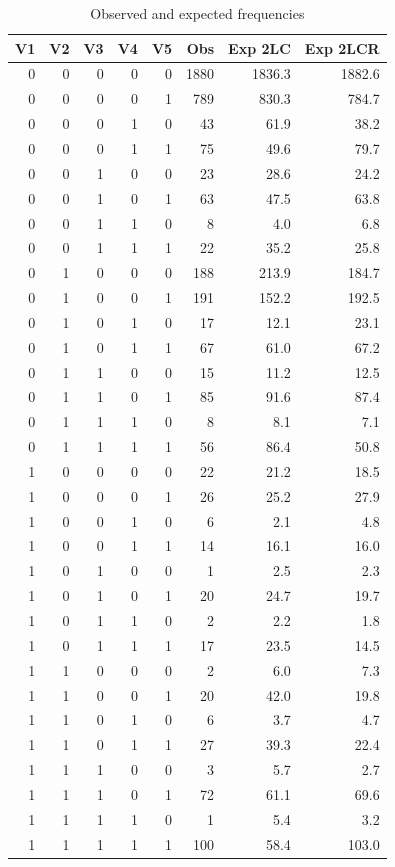 \documentclass[a4paper]{article}
\begin{document}
\begin{table}[ht]
\begin{center}
\begin{tabular}{rrrrrrrr}
  \hline
V1 & V2 & V3 & V4 & V5 & Obs & Exp 2LC & Exp 2LCR \\
  \hline
0 & 0 & 0 & 0 & 0 & 1880 & 1836.3 & 1882.6 \\
  0 & 0 & 0 & 0 & 1 & 789 & 830.3 & 784.7 \\
  0 & 0 & 0 & 1 & 0 & 43 & 61.9 & 38.2 \\
  0 & 0 & 0 & 1 & 1 & 75 & 49.6 & 79.7 \\
  0 & 0 & 1 & 0 & 0 & 23 & 28.6 & 24.2 \\
  0 & 0 & 1 & 0 & 1 & 63 & 47.5 & 63.8 \\
  0 & 0 & 1 & 1 & 0 & 8 & 4.0 & 6.8 \\
  0 & 0 & 1 & 1 & 1 & 22 & 35.2 & 25.8 \\
  0 & 1 & 0 & 0 & 0 & 188 & 213.9 & 184.7 \\
  0 & 1 & 0 & 0 & 1 & 191 & 152.2 & 192.5 \\
  0 & 1 & 0 & 1 & 0 & 17 & 12.1 & 23.1 \\
  0 & 1 & 0 & 1 & 1 & 67 & 61.0 & 67.2 \\
  0 & 1 & 1 & 0 & 0 & 15 & 11.2 & 12.5 \\
  0 & 1 & 1 & 0 & 1 & 85 & 91.6 & 87.4 \\
  0 & 1 & 1 & 1 & 0 & 8 & 8.1 & 7.1 \\
  0 & 1 & 1 & 1 & 1 & 56 & 86.4 & 50.8 \\
  1 & 0 & 0 & 0 & 0 & 22 & 21.2 & 18.5 \\
  1 & 0 & 0 & 0 & 1 & 26 & 25.2 & 27.9 \\
  1 & 0 & 0 & 1 & 0 & 6 & 2.1 & 4.8 \\
  1 & 0 & 0 & 1 & 1 & 14 & 16.1 & 16.0 \\
  1 & 0 & 1 & 0 & 0 & 1 & 2.5 & 2.3 \\
  1 & 0 & 1 & 0 & 1 & 20 & 24.7 & 19.7 \\
  1 & 0 & 1 & 1 & 0 & 2 & 2.2 & 1.8 \\
  1 & 0 & 1 & 1 & 1 & 17 & 23.5 & 14.5 \\
  1 & 1 & 0 & 0 & 0 & 2 & 6.0 & 7.3 \\
  1 & 1 & 0 & 0 & 1 & 20 & 42.0 & 19.8 \\
  1 & 1 & 0 & 1 & 0 & 6 & 3.7 & 4.7 \\
  1 & 1 & 0 & 1 & 1 & 27 & 39.3 & 22.4 \\
  1 & 1 & 1 & 0 & 0 & 3 & 5.7 & 2.7 \\
  1 & 1 & 1 & 0 & 1 & 72 & 61.1 & 69.6 \\
  1 & 1 & 1 & 1 & 0 & 1 & 5.4 & 3.2 \\
  1 & 1 & 1 & 1 & 1 & 100 & 58.4 & 103.0 \\
   \hline
\end{tabular}
\caption{Observed and expected frequencies}
\label{tab:obs}
\end{center}
\end{table}
\end{document}
